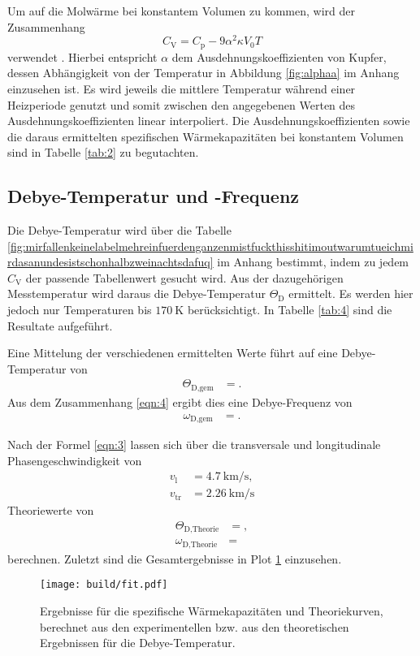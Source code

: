 Um auf die Molwärme bei konstantem Volumen zu kommen, wird der Zusammenhang
\begin{equation}
  C_{\text{V}} = C_{\text{p}} - 9 \alpha^2 \kappa V_0 T
\end{equation}
verwendet \cite{skript}.
Hierbei entspricht $\alpha$ dem Ausdehnungskoeffizienten von Kupfer, dessen Abhängigkeit von der Temperatur in Abbildung \ref{fig:alphaa} im Anhang einzusehen ist.
Es wird jeweils die mittlere Temperatur während einer Heizperiode genutzt und somit zwischen den angegebenen Werten des Ausdehnungskoeffizienten linear interpoliert.
Die Ausdehnungskoeffizienten sowie die daraus ermittelten spezifischen Wärmekapazitäten bei konstantem Volumen sind in Tabelle \ref{tab:2} zu begutachten.



\subsection{Debye-Temperatur und -Frequenz}

Die Debye-Temperatur wird über die Tabelle \ref{fig:mirfallenkeinelabelmehreinfuerdenganzenmistfuckthisshitimoutwarumtueichmirdasanundesistschonhalbzweinachtsdafuq} im Anhang bestimmt, indem zu jedem $C_{\text{V}}$ der passende Tabellenwert gesucht wird.
Aus der dazugehörigen Messtemperatur wird daraus die Debye-Temperatur $\Theta_\text{D}$ ermittelt.
Es werden hier jedoch nur Temperaturen bis $\SI{170}{\kelvin}$ berücksichtigt.
In Tabelle \ref{tab:4} sind die Resultate aufgeführt.



Eine Mittelung der verschiedenen ermittelten Werte führt auf eine Debye-Temperatur von
\begin{align*}
  \Theta_{\text{D,gem}} &= .
\end{align*}
Aus dem Zusammenhang \eqref{eqn:4} ergibt dies eine Debye-Frequenz von
\begin{align*}
  \omega_{\text{D,gem}} &= .
\end{align*}

Nach der Formel \eqref{eqn:3} lassen sich über die transversale und longitudinale Phasengeschwindigkeit \cite{skript} von
\begin{align*}
  v_{\text{l}}  &= \SI{4.7}{\kilo\meter\per\second},\\
  v_{\text{tr}} &= \SI{2.26}{\kilo\meter\per\second}
\end{align*}
Theoriewerte von
\begin{align*}
  \Theta_{\text{D,Theorie}} &= ,\\
  \omega_{\text{D,Theorie}} &= 
\end{align*}
berechnen.
Zuletzt sind die Gesamtergebnisse in Plot \ref{plot:1} einzusehen.

\begin{figure}
  \centering
  \texttt{[image: build/fit.pdf]}
  \caption{Ergebnisse für die spezifische Wärmekapazitäten und Theoriekurven, berechnet aus den experimentellen bzw. aus den theoretischen Ergebnissen für die Debye-Temperatur.}
  \label{plot:1}
\end{figure}
